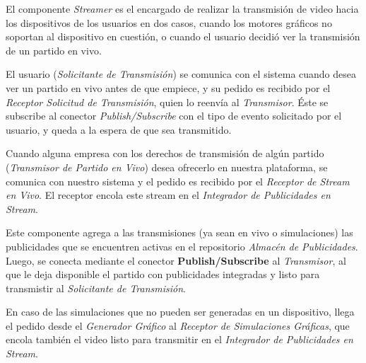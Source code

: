 El componente \emph{Streamer} es el encargado de realizar la transmisión de video hacia los dispositivos de los usuarios en dos casos, cuando los motores gráficos no soportan al dispositivo en cuestión, o cuando el usuario decidió ver la transmisión de un partido en vivo.

El usuario (\emph{Solicitante de Transmisión}) se comunica con el sistema cuando desea ver un partido en vivo antes de que empiece, y su pedido es recibido por el \emph{Receptor Solicitud de Transmisión}, quien lo reenvía al \emph{Transmisor}. Éste se subscribe al conector \emph{Publish/Subscribe} con el tipo de evento solicitado por el usuario, y queda a la espera de que sea transmitido.

Cuando alguna empresa con los derechos de transmisión de algún partido (\emph{Transmisor de Partido en Vivo}) desea ofrecerlo en nuestra plataforma, se comunica con nuestro sistema y el pedido es recibido por el \emph{Receptor de Stream en Vivo}. El receptor encola este stream en el \emph{Integrador de Publicidades en Stream}. 

Este componente agrega a las transmisiones (ya sean en vivo o simulaciones) las publicidades que se encuentren activas en el repositorio \emph{Almacén de Publicidades}. Luego, se conecta mediante el conector \textbf{Publish/Subscribe} al \emph{Transmisor}, al que le deja disponible el partido con publicidades 
integradas y listo para transmistir al \emph{Solicitante de Transmisión}.

En caso de las simulaciones que no pueden ser generadas en un dispositivo, llega el pedido desde el \emph{Generador Gráfico} al \emph{Receptor de Simulaciones Gráficas}, que encola también el video listo para transmitir en el \emph{Integrador de Publicidades en Stream}.


